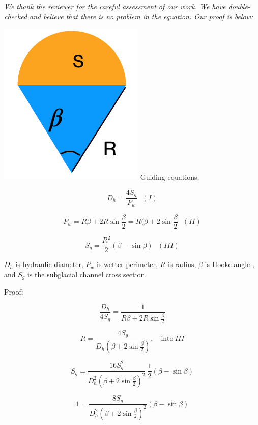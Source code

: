 \documentclass[11pt]{article}
\begin{document}
\begin{itemize}
  \textit{We thank the reviewer for the careful assessment of our work. We have double-checked and believe that there is no problem in the equation. Our proof is below:}

   \includegraphics[width=0.3\linewidth]{Hooke.png}
  Guiding equations:

  \begin{equation}
    D_h = \frac{4S_g}{P_w}~~~(I)
  \end{equation}

  \begin{equation}
    P_w = R \beta +2R \sin\frac{\beta}{2}= R(\beta +2\sin \frac{\beta}{2} ~~~(II)
  \end{equation}

  \begin{equation}
    S_g=\frac{R^2}{2}(\beta - \sin \beta)~~~(III)
  \end{equation}

  $D_h$ is hydraulic diameter, $P_w$ is wetter perimeter, $R$ is radius, $\beta$ is Hooke angle \citep{hooke1990}, and $S_g$ is the subglacial channel cross section.

  Proof:
  
  \begin{linenomath*}
    \begin{equation}
      \frac{D_h}{4S_g} = \frac{1}{R\beta + 2R\sin\frac{\beta}{2}}
    \end{equation}
  \end{linenomath*}

  \begin{equation}
    R = \frac{4S_g}{D_h (\beta +2 \sin \frac{\beta}{2})}, \quad \mathrm{into~} III 
  \end{equation}

  
  \begin{equation}
    S_g = \frac{16 S_g^2}{D_h^2 (\beta +2\sin\frac{\beta}{2})^2} ~\frac{1}{2}(\beta-\sin\beta)
  \end{equation}

  
  \begin{equation}
    1 = \frac{8 S_g}{D_h^2 (\beta +2\sin\frac{\beta}{2})^2} (\beta-\sin\beta)
  \end{equation}



\end{itemize}
\end{document}

